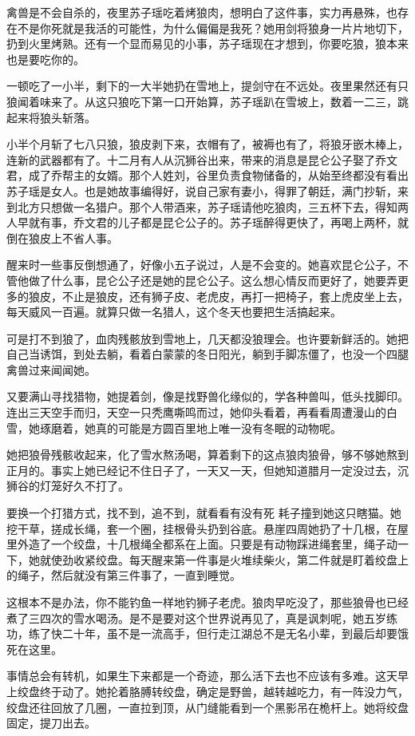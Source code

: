 禽兽是不会自杀的，夜里苏子瑶吃着烤狼肉，想明白了这件事，实力再悬殊，也存在不是你死就是我活的可能性，为什么偏偏是我死？她用剑将狼身一片片地切下，扔到火里烤熟。还有一个显而易见的小事，苏子瑶现在才想到，你要吃狼，狼本来也是要吃你的。

一顿吃了一小半，剩下的一大半她扔在雪地上，提剑守在不远处。夜里果然还有只狼闻着味来了。从这只狼吃下第一口开始算，苏子瑶趴在雪坡上，数着一二三，跳起来将狼头斩落。

小半个月斩了七八只狼，狼皮剥下来，衣帽有了，被褥也有了，将狼牙嵌木棒上，连新的武器都有了。十二月有人从沉狮谷出来，带来的消息是昆仑公子娶了乔文君，成了乔帮主的女婿。那个人姓刘，谷里负责食物储备的，从始至终都没有看出苏子瑶是女人。也是她故事编得好，说自己家有妻小，得罪了朝廷，满门抄斩，来到北方只想做一名猎户。那个人带酒来，苏子瑶请他吃狼肉，三五杯下去，得知两人早就有事，乔文君的儿子都是昆仑公子的。苏子瑶醉得更快了，再喝上两杯，就倒在狼皮上不省人事。

醒来时一些事反倒想通了，好像小五子说过，人是不会变的。她喜欢昆仑公子，不管他做了什么事，昆仑公子还是她的昆仑公子。这么想心情反而更好了，她要弄更多的狼皮，不止是狼皮，还有狮子皮、老虎皮，再打一把椅子，套上虎皮坐上去，每天威风一百遍。就算只做一名猎人，这个冬天也要把生活搞起来。

可是打不到狼了，血肉残骸放到雪地上，几天都没狼理会。也许要新鲜活的。她把自己当诱饵，到处去躺，看着白蒙蒙的冬日阳光，躺到手脚冻僵了，也没一个四腿禽兽过来闻闻她。

又要满山寻找猎物，她提着剑，像是找野兽化缘似的，学各种兽叫，低头找脚印。连出三天空手而归，天空一只秃鹰嘶鸣而过，她仰头看着，再看看周遭漫山的白雪，她琢磨着，她真的可能是方圆百里地上唯一没有冬眠的动物呢。

她把狼骨残骸收起来，化了雪水熬汤喝，算着剩下的这点狼肉狼骨，够不够她熬到正月的。事实上她已经记不住日子了，一天又一天，但她知道腊月一定没过去，沉狮谷的灯笼好久不打了。

要换一个打猎方式，找不到，追不到，就看看有没有死
耗子撞到她这只瞎猫。她挖干草，搓成长绳，套一个圈，挂根骨头扔到谷底。悬崖四周她扔了十几根，在屋里外造了一个绞盘，十几根绳全都系在上面。只要是有动物踩进绳套里，绳子动一下，她就使劲收紧绞盘。每天醒来第一件事是火堆续柴火，第二件就是盯着绞盘上的绳子，然后就没有第三件事了，一直到睡觉。

这根本不是办法，你不能钓鱼一样地钓狮子老虎。狼肉早吃没了，那些狼骨也已经煮了三四次的雪水喝汤。是不是要对这个世界说再见了，真是讽刺呢，她五岁练功，练了快二十年，虽不是一流高手，但行走江湖总不是无名小辈，到最后却要饿死在这里。

事情总会有转机，如果生下来都是一个奇迹，那么活下去也不应该有多难。这天早上绞盘终于动了。她抡着胳膊转绞盘，确定是野兽，越转越吃力，有一阵没力气，绞盘还往回放了几圈，一直拉到顶，从门缝能看到一个黑影吊在桅杆上。她将绞盘固定，提刀出去。

